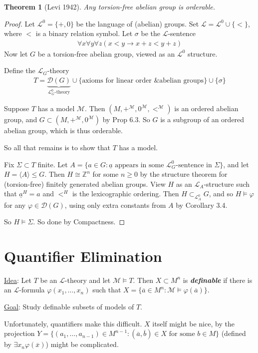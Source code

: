 \documentclass[]{article}
\theoremstyle{custhm}
\newtheorem{theorem}{Theorem}[section]
\theoremstyle{cusdef}
\theoremstyle{custhm}
\theoremstyle{custhm}
\theoremstyle{custhm}
\theoremstyle{ex}
\theoremstyle{custhm}
\theoremstyle{cusdef}
\theoremstyle{remark}
\theoremstyle{remark}
\newcommand{\Z}{\mathbb{Z}}
\newcommand{\ra}{\rightarrow}
\newcommand{\undf}[1]{\textit{\textbf{#1}}}
\renewcommand{\L}{\mathcal{L}}
\newcommand{\M}{\mathcal{M}}
\renewcommand{\phi}{\varphi}
\renewcommand{\bar}{\overline}
\newcommand{\D}{\mathcal{D}}
\begin{document}
\begin{theorem}[Levi 1942]
Any torsion-free abelian group is orderable.
\end{theorem}
\begin{proof}
Let $\L^0 = \{+,0\}$ be the language of (abelian) groups. Set $\L = \L^0 \cup\{<\}$, where $<$ is a binary relation symbol. Let $\sigma$ be the $\L$-sentence
\begin{align*}
\forall x \forall y\forall z ( x< y \ra x + z < y + z)
\end{align*}
Now let $G$ be a torsion-free abelian group, viewed as an $\L^0$ structure.

Define the $\L_G$-theory
\begin{align*}
T = \underbrace{\D(G)}_{\L_G^0\textrm{-theory}}\cup\{\textrm{axioms for linear order \& abelian groups}\}\cup\{\sigma\}
\end{align*}

Suppose $T$ has a model $\M$. Then $(M,+^\M,0^\M,<^\M)$ is an ordered abelian group, and $G\subset (M,+^\M,0^\M)$ by Prop 6.3. So $G$ is a subgroup of an ordered abelian group, which is thus orderable.

So all that remains is to show that $T$ has a model.

Fix $\Sigma \subset T$ finite. Let $A = \{a\in G: \underline{a}\textrm{ appears in some }\L_G^0\textrm{-sentence in }\Sigma\}$, and let $H = \langle A\rangle \le G$. Then $H\cong \Z^n$ for some $n\ge 0$ by the structure theorem for (torsion-free) finitely generated abelian groups. View $H$ as an $\L_A$-structure such that $\underline{a}^H = a$ and $<^H$ is the lexicographic ordering. Then $H\subset_{\L_A^0} G$, and so $H\models \phi$ for any $\phi \in \D(G)$, using only extra constants from $A$ by Corollary 3.4.

So $H\models \Sigma$. So done by Compactness.
\end{proof}


\section{Quantifier Elimination}

\underline{Idea}: Let $T$ be an $\L$-theory and let $\M\models T$. Then $X\subset M^n$ is \undf{definable} if there is an $\L$-formula $\phi(x_1,\dots,x_n)$ such that $X = \{\bar{a}\in M^n : \M\models \phi(\bar{a})\}$.

\underline{Goal}: Study definable subsets of models of $T$.

Unfortunately, quantifiers make this difficult. $X$ itself might be nice, by the projection $Y = \{(a_1,\dots,a_{n-1})\in M^{n-1}:(\bar{a},\bar{b})\in X\textrm{ for some }b\in M\}$ (defined by $\exists x_n \phi(\bar{x})$) might be complicated.
\end{document}
